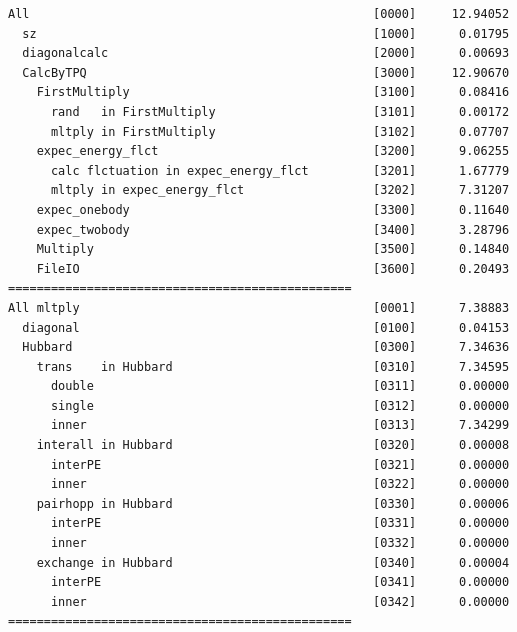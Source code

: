 \begin{minipage}{16cm}
\begin{screen}
\begin{verbatim}
All                                                [0000]     12.94052
  sz                                               [1000]      0.01795
  diagonalcalc                                     [2000]      0.00693
  CalcByTPQ                                        [3000]     12.90670
    FirstMultiply                                  [3100]      0.08416
      rand   in FirstMultiply                      [3101]      0.00172
      mltply in FirstMultiply                      [3102]      0.07707
    expec_energy_flct                              [3200]      9.06255
      calc flctuation in expec_energy_flct         [3201]      1.67779
      mltply in expec_energy_flct                  [3202]      7.31207
    expec_onebody                                  [3300]      0.11640
    expec_twobody                                  [3400]      3.28796
    Multiply                                       [3500]      0.14840
    FileIO                                         [3600]      0.20493
================================================
All mltply                                         [0001]      7.38883
  diagonal                                         [0100]      0.04153
  Hubbard                                          [0300]      7.34636
    trans    in Hubbard                            [0310]      7.34595
      double                                       [0311]      0.00000
      single                                       [0312]      0.00000
      inner                                        [0313]      7.34299
    interall in Hubbard                            [0320]      0.00008
      interPE                                      [0321]      0.00000
      inner                                        [0322]      0.00000
    pairhopp in Hubbard                            [0330]      0.00006
      interPE                                      [0331]      0.00000
      inner                                        [0332]      0.00000
    exchange in Hubbard                            [0340]      0.00004
      interPE                                      [0341]      0.00000
      inner                                        [0342]      0.00000
================================================
\end{verbatim}
\end{screen}
\end{minipage}

